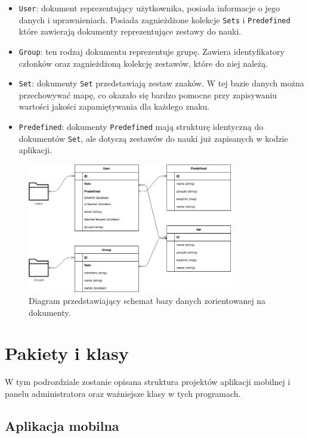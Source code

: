 \documentclass[a4paper,twoside,12pt]{book}
\begin{document}
\begin{itemize}
\item \texttt{User}: dokument reprezentujący użytkownika, posiada informacje o jego danych i uprawnieniach. Posiada zagnieżdżone kolekcje \texttt{Sets} i \texttt{Predefined} które zawierają dokumenty reprezentujące zestawy do nauki.
\item \texttt{Group}: ten rodzaj dokumentu reprezentuje grupę. Zawiera identyfikatory członków oraz zagnieżdżoną kolekcję zestawów, które do niej należą.
\item \texttt{Set}: dokumenty \texttt{Set} przedstawiają zestaw znaków. W tej bazie danych można przechowywać mapę, co okazało się bardzo pomocne przy zapisywaniu wartości jakości zapamiętywania dla każdego znaku.
\item \texttt{Predefined}: dokumenty \texttt{Predefined} mają strukturę identyczną do dokumentów \texttt{Set}, ale dotyczą zestawów do nauki już zapisanych w kodzie aplikacji.
\end{itemize}

\begin{figure}[]
\centering
\includegraphics[width=0.8\textwidth]{firestore.drawio}
\caption{Diagram przedstawiający schemat bazy danych zorientowanej na dokumenty.}
\label{fig:firestore}
\end{figure}

\section{Pakiety i klasy}

W tym podrozdziale zostanie opisana struktura projektów aplikacji mobilnej i panelu administratora oraz ważniejsze klasy w tych programach.

\subsection{Aplikacja mobilna}
\end{document}
